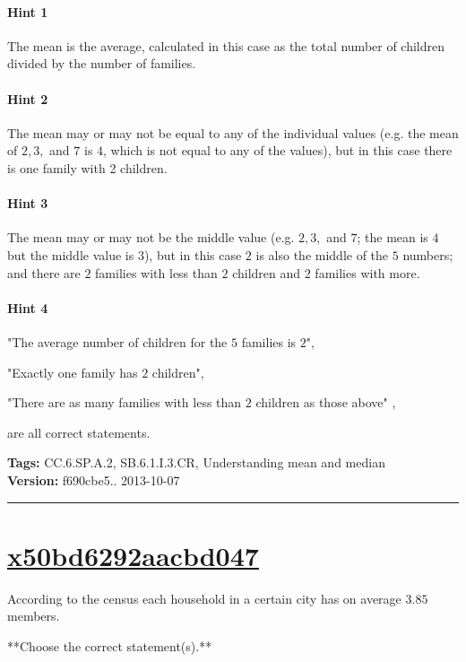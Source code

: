 \documentclass[twocolumn,10pt]{article}
\begin{document}
\paragraph{Hint 1}The mean is the average, calculated in this case as the total number of children divided by the number of families.  

\paragraph{Hint 2}The mean may or may not be equal to any of the individual values (e.g. the mean of $2,3,$ and $7$ is $4$, which is not equal to any of the values), but in this case there is one family with 2 children.

\paragraph{Hint 3}The mean may or may not be the middle value (e.g. $2,3,$ and $7$; the mean is $4$ but the middle value is $3$), but in this case $2$ is also the middle of the $5$ numbers; and there are $2$ families with less than $2$ children and $2$ families with more. 

\paragraph{Hint 4}"The average number of children for the $5$ families is $2$",

"Exactly one family has $2$ children",

"There are as many families with less than $2$ children as those above" ,

are all correct statements.



\medskip
\noindent
\textbf{Tags:} {\footnotesize CC.6.SP.A.2, SB.6.1.I.3.CR, Understanding mean and median}\\
\textbf{Version:} f690cbe5.. 2013-10-07
\smallskip\hrule





\section{\href{https://www.khanacademy.org/devadmin/content/items/x50bd6292aacbd047}{x50bd6292aacbd047}}

\noindent
According to the census each household in a certain city has on average $3.85$ members.

**Choose the correct statement(s).**
\end{document}
